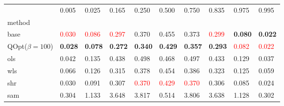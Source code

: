 \begin{tabular}{llllllllll}
\toprule
 & 0.005 & 0.025 & 0.165 & 0.250 & 0.500 & 0.750 & 0.835 & 0.975 & 0.995 \\
method &  &  &  &  &  &  &  &  &  \\
\midrule
base & \textcolor{red}{0.030} & \textcolor{red}{0.086} & \textcolor{red}{0.297} & 0.370 & 0.455 & 0.373 & \textcolor{red}{0.299} & \textbf{0.080} & \textbf{0.022} \\
\midrule
QOpt($\beta=100$) & \textbf{0.028} & \textbf{0.078} & \textbf{0.272} & \textbf{0.340} & \textbf{0.429} & \textbf{0.357} & \textbf{0.293} & \textcolor{red}{0.082} & \textcolor{red}{0.022} \\
ols & 0.042 & 0.135 & 0.438 & 0.498 & 0.468 & 0.497 & 0.433 & 0.129 & 0.037 \\
wls & 0.066 & 0.126 & 0.315 & 0.378 & 0.454 & 0.386 & 0.323 & 0.125 & 0.059 \\
shr & 0.030 & 0.091 & 0.307 & \textcolor{red}{0.370} & \textcolor{red}{0.429} & \textcolor{red}{0.370} & 0.306 & 0.085 & 0.024 \\
sam & 0.304 & 1.133 & 3.648 & 3.817 & 0.514 & 3.806 & 3.638 & 1.128 & 0.302 \\
\bottomrule
\end{tabular}